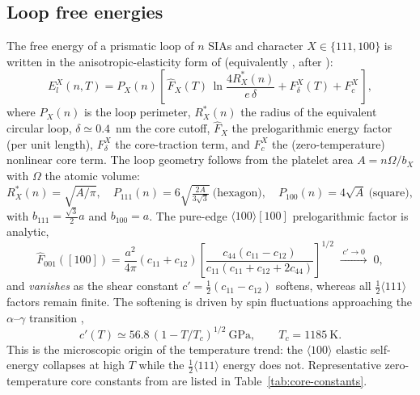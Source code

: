 \subsection{Loop free energies}
\label{sec:loop-energies}

The free energy of a prismatic loop of $n$ SIAs and character $X\in\{111,100\}$
is written in the anisotropic-elasticity form of \citet{Dudarev2008}
(equivalently \citealp{Marian2002}, after \citealp{HirthLothe}):
\begin{equation}
  E_l^{X}(n,T) = P_X(n)\!\left[\,
    \hat F_X(T)\,\ln\!\frac{4R^\ast_X(n)}{e\,\delta}
    + F_\delta^{X}(T) + F_c^{X}\,\right],
  \label{eq:loop-energy}
\end{equation}
where $P_X(n)$ is the loop perimeter, $R^\ast_X(n)$ the radius of the equivalent
circular loop, $\delta\simeq0.4$~nm the core cutoff, $\hat F_X$ the
prelogarithmic energy factor (per unit length), $F_\delta^{X}$ the
core-traction term, and $F_c^{X}$ the (zero-temperature) nonlinear core term.
The loop geometry follows from the platelet area $A=n\Omega/b_X$ with $\Omega$
the atomic volume:
\begin{equation}
  R^\ast_X(n)=\sqrt{A/\pi},\quad
  P_{111}(n)=6\sqrt{\tfrac{2A}{3\sqrt3}}\ \text{(hexagon)},\quad
  P_{100}(n)=4\sqrt{A}\ \text{(square)},
  \label{eq:loop-geometry}
\end{equation}
with $b_{111}=\tfrac{\sqrt3}{2}a$ and $b_{100}=a$.  The pure-edge
$\langle100\rangle[100]$ prelogarithmic factor is analytic,
\begin{equation}
  \hat F_{001}([100]) = \frac{a^2}{4\pi}(c_{11}{+}c_{12})
  \!\left[\frac{c_{44}(c_{11}{-}c_{12})}{c_{11}(c_{11}{+}c_{12}{+}2c_{44})}\right]^{1/2}
  \;\xrightarrow{\;c'\to0\;}\;0,
  \label{eq:F100}
\end{equation}
and \emph{vanishes} as the shear constant $c'=\tfrac12(c_{11}-c_{12})$ softens,
whereas all $\tfrac12\langle111\rangle$ factors remain finite.  The softening is
driven by spin fluctuations approaching the $\alpha$--$\gamma$ transition
\citep{Dudarev2008},
\begin{equation}
  c'(T)\simeq 56.8\,(1-T/T_c)^{1/2}\ \text{GPa},\qquad T_c=1185\ \text{K}.
  \label{eq:cprime}
\end{equation}
This is the microscopic origin of the temperature trend: the
$\langle100\rangle$ elastic self-energy collapses at high $T$ while the
$\tfrac12\langle111\rangle$ energy does not.  Representative zero-temperature
core constants from \citet{Dudarev2008} are listed in
Table~\ref{tab:core-constants}.

